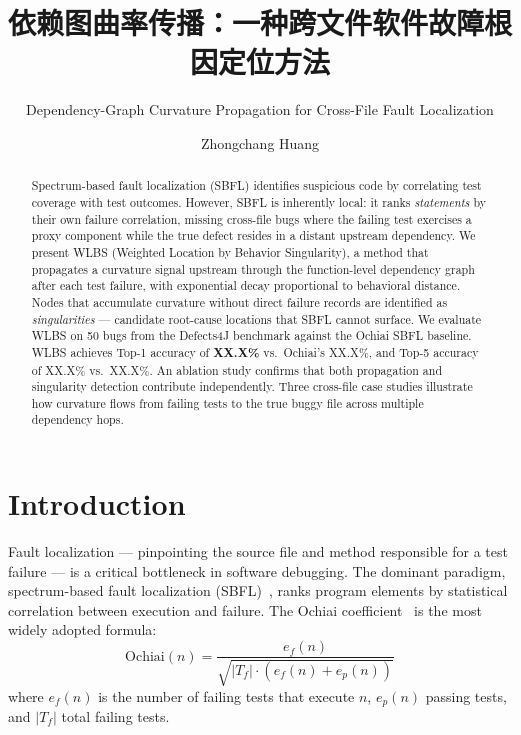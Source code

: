 \documentclass[acmtog]{acmart}
\title{依赖图曲率传播：一种跨文件软件故障根因定位方法}
\subtitle{Dependency-Graph Curvature Propagation for Cross-File Fault Localization}
\author{Zhongchang Huang}
\affiliation{\institution{Independent Researcher}\city{Nanjing}\country{China}}
\begin{document}
\begin{abstract}
Spectrum-based fault localization (SBFL) identifies suspicious code by correlating
test coverage with test outcomes. However, SBFL is inherently local: it ranks
\emph{statements} by their own failure correlation, missing cross-file bugs where
the failing test exercises a proxy component while the true defect resides in a
distant upstream dependency. We present WLBS (Weighted Location by Behavior
Singularity), a method that propagates a curvature signal upstream through the
function-level dependency graph after each test failure, with exponential decay
proportional to behavioral distance. Nodes that accumulate curvature without
direct failure records are identified as \emph{singularities} — candidate
root-cause locations that SBFL cannot surface. We evaluate WLBS on 50 bugs from
the Defects4J benchmark against the Ochiai SBFL baseline. WLBS achieves
Top-1 accuracy of \textbf{XX.X\%} vs.~Ochiai's XX.X\%, and Top-5 accuracy of
XX.X\% vs.~XX.X\%. An ablation study confirms that both propagation and
singularity detection contribute independently. Three cross-file case studies
illustrate how curvature flows from failing tests to the true buggy file across
multiple dependency hops.
\end{abstract}


\maketitle

\section{Introduction}\label{sec:intro}

Fault localization — pinpointing the source file and method responsible for a
test failure — is a critical bottleneck in software debugging. The dominant
paradigm, spectrum-based fault localization (SBFL)~\cite{jones2002visualization},
ranks program elements by statistical correlation between execution and failure.
The Ochiai coefficient~\cite{abreu2007accuracy} is the most widely adopted formula:
\[
  \text{Ochiai}(n) = \frac{e_f(n)}{\sqrt{|T_f| \cdot (e_f(n) + e_p(n))}}
\]
where $e_f(n)$ is the number of failing tests that execute $n$, $e_p(n)$ passing
tests, and $|T_f|$ total failing tests.
\end{document}
